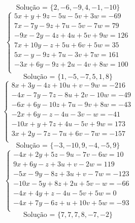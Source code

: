 \documentclass[12pt,oneside,a4paper]{article}
\begin{document}
\begin{equation*}
\text{Solução = }\{2,-6,-9,4,-1,-10\}
\end{equation*}
\vspace{\baselineskip}
\begin{equation*}
\begin{cases}
5x+y+9z-5u-5v+3w=-69 \\
7x-7y-9z+7u-5v-7w=79 \\
-9x-2y-4z+4u+5v+9w=126 \\
7x+10y-z+5u+6v+5w=35 \\
5x-y-9z+7u-3v+7w=161 \\
-3x+6y-9z+2u-4v+8w=100 \\
\end{cases}
\end{equation*}
\begin{equation*}
\text{Solução = }\{1,-5,-7,5,1,8\}
\end{equation*}
\vspace{\baselineskip}
\begin{equation*}
\begin{cases}
8x+3y-4z+10u+v-9w=-216 \\
-4x-7y-7z-8u+2v-10w=-49 \\
-6x+6y-10z+7u-9v+8w=-43 \\
-2x+6y-z-4u-3v-w=-41 \\
-10x+y+7z+4u-5v+9w=173 \\
3x+2y-7z-7u+6v-7w=-157 \\
\end{cases}
\end{equation*}
\begin{equation*}
\text{Solução = }\{-3,-10,9,-4,-5,9\}
\end{equation*}
\vspace{\baselineskip}
\begin{equation*}
\begin{cases}
-4x+2y+5z-9u-7v-6w=10 \\
9x+6y-z+3u+v-2w=119 \\
-5x-9y-8z+3u+v-7w=-123 \\
-10x-5y+8z+2u+5v-w=-66 \\
-4x+4y+z-4u-5v+5w=0 \\
-4x+7y-6z+u+10v+5w=-93 \\
\end{cases}
\end{equation*}
\begin{equation*}
\text{Solução = }\{7,7,7,8,-7,-2\}
\end{equation*}
\end{document}
